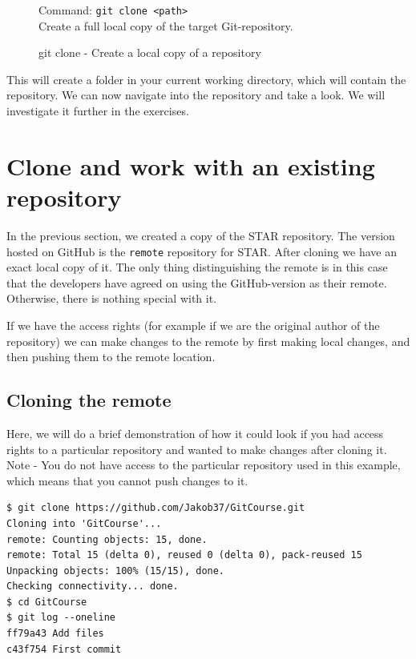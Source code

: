 \documentclass[../main/git_course_main.tex]{subfiles}
\begin{document}
\begin{figure}[h!]
\begin{bluebox}
Command: \verb$git clone <path>$ \\

Create a full local copy of the target Git-repository.
\end{bluebox}
\label{command:clone}
\caption{git clone - Create a local copy of a repository}
\end{figure}

This will create a folder in your current working directory, which will contain the repository. We can now navigate into the repository and take a look. We will investigate it further in the exercises.

\section{Clone and work with an existing repository}

In the previous section, we created a copy of the STAR repository. The version hosted
on GitHub is the \verb$remote$ repository for STAR. After cloning we have an exact local
copy of it. The only thing distinguishing the remote is in this case that the developers
have agreed on using the GitHub-version as their remote. Otherwise, there is nothing
special with it.

If we have the access rights (for example if we are the original author of the repository) we can make changes to the remote by first making local changes, and then pushing them to the remote location.

\subsection{Cloning the remote}

Here, we will do a brief demonstration of how it could look if you had access rights
to a particular repository and wanted to make changes after cloning it. Note - 
You do not have access to the particular repository used in this example, which means that you cannot push changes to it.

\begin{codebox}
\begin{lstlisting}
$ git clone https://github.com/Jakob37/GitCourse.git
Cloning into 'GitCourse'...
remote: Counting objects: 15, done.
remote: Total 15 (delta 0), reused 0 (delta 0), pack-reused 15
Unpacking objects: 100% (15/15), done.
Checking connectivity... done.
$ cd GitCourse
$ git log --oneline
ff79a43 Add files
c43f754 First commit
\end{lstlisting}
\end{codebox}
\end{document}
